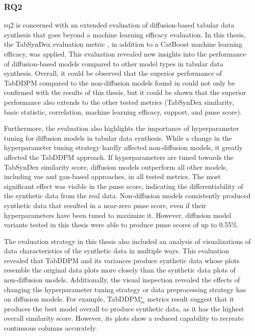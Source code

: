 \subsubsection{RQ2}
\gls{rq}2 is concerned with an extended evaluation of diffusion-based tabular data synthesis that goes beyond a machine learning efficacy evaluation.
In this thesis, the TabSynDex evaluation metric \cite{chundawat2022UniversalMetricRobust}, in addition to a CatBoost machine learning efficacy, was applied.
This evaluation revealed new insights into the performance of diffusion-based models compared to other \gls{model} types in tabular data synthesis.
Overall, it could be observed that the superior performance of TabDDPM compared to the non-diffusion models found in \cite{kotelnikov2022TabDDPMModellingTabular}
could not only be confirmed with the results of this thesis, but it could be shown that the superior performance also extends to the other tested metrics (TabSynDex similarity, basic statistic, correlation, machine learning efficacy, support, and \gls{pmse} score).

Furthermore, the evaluation also highlights the importance of hyperparameter tuning for diffusion models in tabular data synthesis.
While a change in the hyperparameter tuning strategy hardly affected non-diffusion models, it greatly affected the TabDDPM approach.
If hyperparameters are tuned towards the TabSynDex similarity score, diffusion models outperform all other models, including \gls{vae} and \gls{gan}-based approaches,
in all tested metrics.
The most significant effect was visible in the \gls{pmse} score, indicating the differentiability of the synthetic data from the real data.
Non-diffusion models consistently produced synthetic data that resulted in a near-zero \gls{pmse} score, even if their hyperparameters have been tuned to maximize it.
However, diffusion \gls{model} variants tested in this thesis were able to produce \gls{pmse} scores of up to 0.55\%.

The evaluation strategy in this thesis also included an analysis of visualizations of data characteristics of the synthetic data in multiple ways.
This evaluation revealed that TabDDPM and its variances produce synthetic data whose plots resemble the original data plots more closely than the synthetic data plots of non-diffusion models.
Additionally, the visual inspection revealed the effects of changing the hyperparameter tuning strategy or data preprocessing strategy has on diffusion models.
For example, TabDDPM$^{s}_m$ metrics result suggest that it produces the best \gls{model} overall to produce synthetic data, as it has the highest overall similarity score.
However, its plots show a reduced capability to recreate continuous columns accurately.


